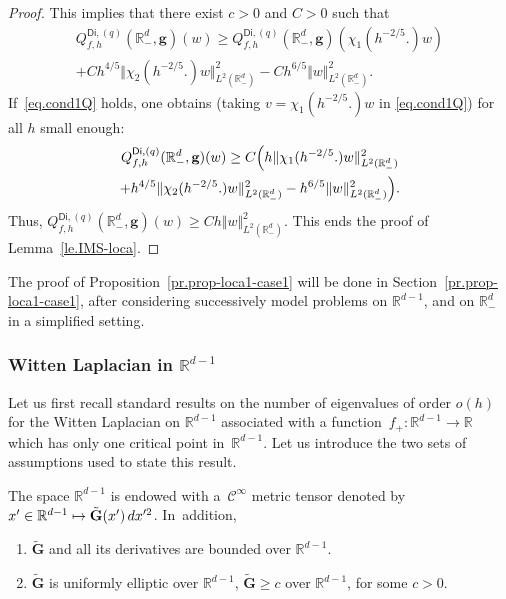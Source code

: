 \documentclass[JEP,XML,SOM,Unicode,NoEqCountersInSection,NoFloatCountersInSection,published]{cedram}
\newenvironment{enumeratei}
{\bgroup\def\theenumi{\roman{enumi}}\def\theenumii{\arabic{enumii}}\begin{enumerate}}
{\end{enumerate}\egroup}
\newcommand\mto{\mathchoice{\longmapsto}{\mapsto}{\mapsto}{\mapsto}}
\newcommand{\mbf}[1]{\mathbf{#1}}
\theoremstyle{plain}
\theoremstyle{definition}
\newenvironment{manualassumption}[1]{%
\renewcommand\themanualassumptioninner{#1}%
\manualassumptioninner}{\endmanualassumptioninner}
\begin{document}
\begin{proof}
This implies that there exist $c>0$ and $C>0$ such that
\begin{multline*}
Q_{f,h}^{\mathsf{Di},(q)}(\mathbb R^d_-,\mbf g)(w)\ge Q_{f,h}^{\mathsf{Di},(q)}(\mathbb R^d_-,\mbf g)(\chi_1(h^{-2/5 }.)w)\\+Ch^{4/5}\Vert \chi_2(h^{-2/5 }.) w \Vert_{L^2(\mathbb R_-^d)}^2
-Ch^{6/5} \Vert w \Vert_{L^2(\mathbb R_-^d)}^2.
\end{multline*}
If~\eqref{eq.cond1Q} holds,
one obtains (taking $v=\chi_1(h^{-2/5 }.) w$ in \eqref{eq.cond1Q}) for all $h$ small enough:
\begin{multline*}
Q_{f,h}^{\mathsf{Di},(q)}(\mathbb R^d_-,\mbf g)(w)\ge C\Bigl(h \Vert
\chi_1(h^{-2/5
}.) w
\Vert_{L^2(\mathbb
R_-^d)}^2\\
+
h^{4/5}
\Vert
\chi_2(h^{-2/5
}.) w
\Vert_{L^2(\mathbb
R_-^d)}^2- h^{6/5} \Vert w \Vert_{L^2(\mathbb R_-^d)}^2\Bigr).
\end{multline*}
Thus, $Q_{f,h}^{\mathsf{Di},(q)}(\mathbb R^d_-,\mbf g)(w)\ge Ch \Vert w \Vert_{L^2(\mathbb R_-^d)}^2$. This ends the proof of Lemma~\ref{le.IMS-loca}.
\end{proof}
The proof of Proposition~\ref{pr.prop-loca1-case1} will be done in
Section~\ref{pr.prop-loca1-case1}, after considering successively
model problems on $\mathbb R^{d-1}$, and on $\mathbb R^d_-$ in a
simplified setting.

\subsubsection{Witten Laplacian in $\mathbb R^{d-1}$}\label{sec.Rdmoins_d-1}
Let us first recall standard results on the number of eigenvalues of
order $o(h)$ for the Witten Laplacian on $\mathbb R^{d-1}$ associated with a function~$f_+:\mathbb R^{d-1}\to \mathbb R$ which has only one critical point in~$\mathbb R^{d-1}$.
Let us introduce the two sets of assumptions used to state this result.

\begin{manualassumption}{$(\textup{Metric-}\mathbb R^{d-1})$}\label{MetricRd-1}
The space ${\mathbb R^{d-1}}$ is endowed with a~$\mathcal C^\infty$ metric tensor denoted by $x'\in \mathbb R^{d-1} \mto \tilde {\mbf G}(x')\, dx'^2$. In~addition,
\begin{enumeratei}
\item\label{MetricRd-1i}
$\tilde {\mbf G}$ and all its derivatives are bounded over ${\mathbb R^{d-1}}$.
\item\label{MetricRd-1ii}
$ \tilde {\mbf G}$ is uniformly elliptic over $ {\mathbb
R^{d-1}}$, \ie $ \tilde {\mbf G}\ge c$ over $\mathbb R^{d-1}$, for some $c>0$.
\end{enumeratei}
\end{manualassumption}
\end{document}
